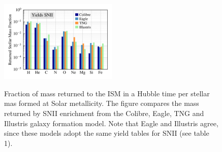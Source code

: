 \documentclass[11pt,a4paper,fleqn,usenatbib,twocolumn]{mnras}
\begin{document}
\begin{figure} 
\begin{center}
\includegraphics[angle=0,width=0.5\textwidth]{../figures/Comparison_SNIIYield_tables.png}\\
\caption{Fraction of mass returned to the ISM in a Hubble time per stellar mas formed at Solar metallicity. The figure compares the mass returned by SNII enrichment from the Colibre, Eagle, TNG and Illustris galaxy formation model. Note that Eagle and Illustris agree, since these models adopt the same yield tables for SNII (see table 1).}
\label{SNIIyields}
\end{center}
\end{figure}



%
%
\end{document}
